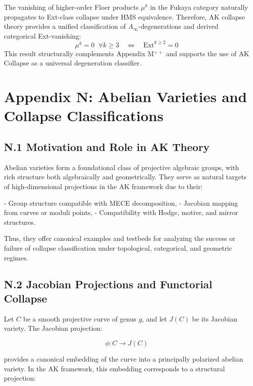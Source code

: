 \documentclass[11pt]{article}
\begin{document}
\begin{axiom}
\begin{axiom}
{{The vanishing of higher-order Floer products \( \mu^k \) in the Fukaya category naturally propagates to Ext-class collapse under HMS equivalence.  
Therefore, AK collapse theory provides a unified classification of \( A_\infty \)-degenerations and derived categorical Ext-vanishing:
\[
\boxed{
\mu^k = 0 \;\; \forall k \geq 3 \quad \Leftrightarrow \quad \mathrm{Ext}^{k \geq 2} = 0
}
\]
This result structurally complements Appendix M$^{++}$ and supports the use of AK Collapse as a universal degeneration classifier.




\section*{Appendix N: Abelian Varieties and Collapse Classifications}

\subsection*{N.1 Motivation and Role in AK Theory}

Abelian varieties form a foundational class of projective algebraic groups, with rich structure both algebraically and geometrically.  
They serve as natural targets of high-dimensional projections in the AK framework due to their:

- Group structure compatible with MECE decomposition,
- Jacobian mapping from curves or moduli points,
- Compatibility with Hodge, motive, and mirror structures.

Thus, they offer canonical examples and testbeds for analyzing the success or failure of collapse classification under topological, categorical, and geometric regimes.

\subsection*{N.2 Jacobian Projections and Functorial Collapse}

Let \( C \) be a smooth projective curve of genus \( g \), and let \( J(C) \) be its Jacobian variety.  
The Jacobian projection:

\[
\phi: C \longrightarrow J(C)
\]

provides a canonical embedding of the curve into a principally polarized abelian variety.  
In the AK framework, this embedding corresponds to a structural projection:

}}
\end{axiom}
\end{axiom}
\end{document}
